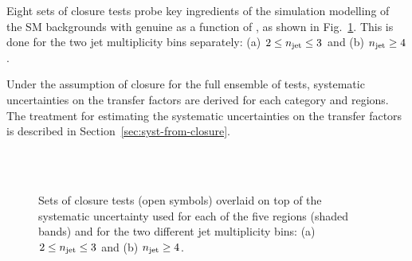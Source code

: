 Eight sets of closure tests probe key ingredients of the simulation modelling 
of the SM backgrounds with genuine \met as a function of \scalht, as shown in
Fig.~\ref{fig:closure}. This is done for the two jet multiplicity bins
separately: (a) $2 \leq n_{\text{jet}} \leq 3$ and (b) $n_{\text{jet}} \geq 4$.

Under the assumption of closure for the full ensemble of tests,
systematic uncertainties on the transfer factors are derived for each
\njet category and \scalht regions. The treatment for
estimating the systematic uncertainties on the transfer factors is
described in Section~\ref{sec:syst-from-closure}.

\begin{figure}[h!]
  \begin{center}
     \\
     \\
    \caption{Sets of closure tests (open symbols) overlaid on top of
      the systematic uncertainty used for each of the five \scalht
      regions (shaded bands) and for the two different jet
      multiplicity bins: (a) $2 \leq n_{\text{jet}} \leq 3$ and (b) $n_{\text{jet}} \geq
      4$.  }
    \label{fig:closure}
  \end{center} 
\end{figure}

